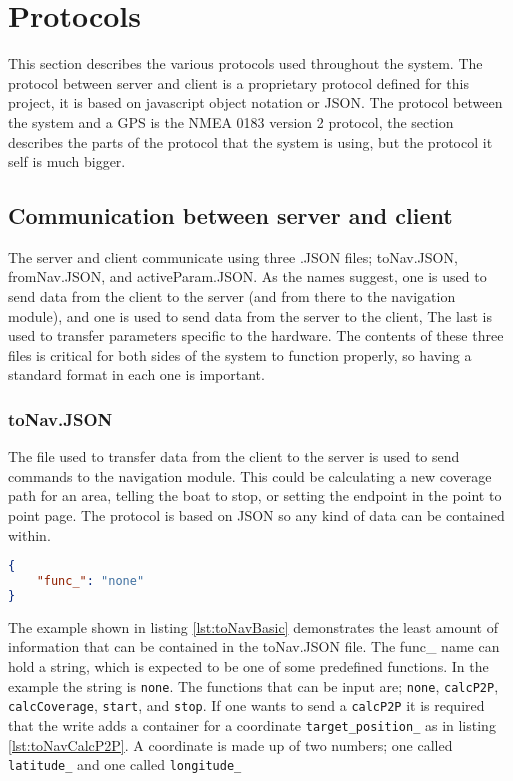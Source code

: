 \section{Protocols}
This section describes the various protocols used throughout the system. The protocol between server and client is a proprietary protocol defined for this project, it is based on javascript object notation or JSON. The protocol between the system and a GPS is the NMEA 0183 version 2 protocol, the section describes the parts of the protocol that the system is using, but the protocol it self is much bigger. 

\subsection{Communication between server and client}

The server and client communicate using three .JSON files; toNav.JSON, fromNav.JSON, and activeParam.JSON. As the names suggest, one is used to send data from the client to the server (and from there to the navigation module), and one is used to send data from the server to the client, The last is used to transfer parameters specific to the hardware. The contents of these three files is critical for both sides of the system to function properly, so having a standard format in each one is important. 

\subsubsection{toNav.JSON}

The file used to transfer data from the client to the server is used to send commands to the navigation module. This could be calculating a new coverage path for an area, telling the boat to stop, or setting the endpoint in the point to point page.
The protocol is based on JSON so any kind of data can be contained within.

\begin{lstlisting}[caption = {Example of the least information in the toNav.JSON file}, captionpos=b, label={lst:toNavBasic}, language=json,firstnumber=1]
{
	"func_": "none"
}
\end{lstlisting}

The example shown in listing \ref{lst:toNavBasic} demonstrates the least amount of information that can be contained in the toNav.JSON file. The func_ name can hold a string, which is expected to be one of some predefined functions. In the example the string is \texttt{none}.
The functions that can be input are; \texttt{none}, \texttt{calcP2P}, \texttt{calcCoverage}, \texttt{start}, and \texttt{stop}.
If one wants to send a \texttt{calcP2P} it is required that the write adds a container for a coordinate \texttt{target_position_} as in listing \ref{lst:toNavCalcP2P}. A coordinate is made up of two numbers; one called \texttt{latitude_} and one called \texttt{longitude_}

